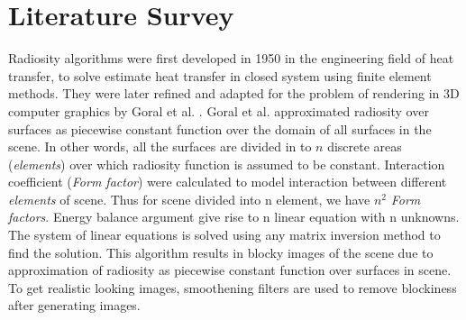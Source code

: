 \chapter{\label{ch:literature}Literature Survey}


Radiosity algorithms were first developed in 1950 in the engineering field of heat transfer, to solve estimate heat transfer in closed system using finite element methods. They were later refined and adapted for the problem of rendering in 3D computer graphics by Goral et al. \cite{Goral}. Goral et al. approximated  radiosity over surfaces as piecewise constant function over the domain of all surfaces in the scene. In other words, all the surfaces are divided in to $n$ discrete areas ({\em elements}) over which radiosity function is assumed to be constant. Interaction coefficient ({\em Form factor}) were calculated to model interaction between different {\em elements} of scene. Thus for scene divided into n element, we have $n^2$  {\em Form factors}. Energy balance argument give rise to n linear equation with n unknowns. The system of linear equations is solved using any matrix inversion method to find the solution. This algorithm results in blocky images of the scene due to approximation of radiosity as piecewise constant function over surfaces in scene. To get realistic looking images, smoothening filters are used to remove blockiness after generating images. 

